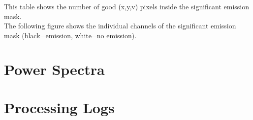 \documentclass[11pt]{article}
\begin{document}
\noindent This table shows the number of good (x,y,v) pixels inside the significant emission mask.\\



\noindent The following figure shows the individual channels of the
significant emission mask (black=emission, white=no emission).\\



\section{Power Spectra}
\label{sec:powerspec}
%
%

\section{Processing Logs}
\label{sec:logs}

\end{document}
